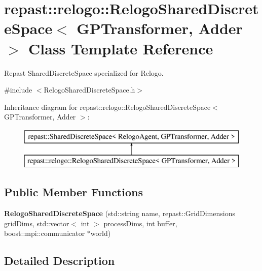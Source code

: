 \hypertarget{classrepast_1_1relogo_1_1_relogo_shared_discrete_space}{\section{repast\-:\-:relogo\-:\-:Relogo\-Shared\-Discrete\-Space$<$ G\-P\-Transformer, Adder $>$ Class Template Reference}
\label{classrepast_1_1relogo_1_1_relogo_shared_discrete_space}
}


Repast Shared\-Discrete\-Space specialized for Relogo.  




{\ttfamily \#include $<$Relogo\-Shared\-Discrete\-Space.\-h$>$}

Inheritance diagram for repast\-:\-:relogo\-:\-:Relogo\-Shared\-Discrete\-Space$<$ G\-P\-Transformer, Adder $>$\-:\begin{figure}[H]
\begin{center}
\leavevmode
\includegraphics[height=2.000000cm]{classrepast_1_1relogo_1_1_relogo_shared_discrete_space}
\end{center}
\end{figure}
\subsection*{Public Member Functions}
\begin{DoxyCompactItemize}
\item 
\hypertarget{classrepast_1_1relogo_1_1_relogo_shared_discrete_space_afd6aadc89e1d8b95c451dcd7cdccf5d3}{{\bfseries Relogo\-Shared\-Discrete\-Space} (std\-::string name, repast\-::\-Grid\-Dimensions grid\-Dims, std\-::vector$<$ int $>$ process\-Dims, int buffer, boost\-::mpi\-::communicator $\ast$world)}\label{classrepast_1_1relogo_1_1_relogo_shared_discrete_space_afd6aadc89e1d8b95c451dcd7cdccf5d3}

\end{DoxyCompactItemize}


\subsection{Detailed Description}
